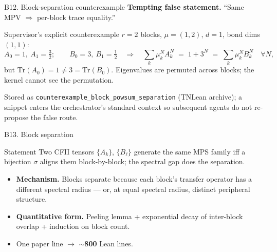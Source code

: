 \documentclass[aspectratio=169,10pt]{beamer}
\newcommand{\Tr}{\mathrm{Tr}}
\begin{document}
\begin{frame}{B12. Block-separation counterexample}
    \textbf{Tempting false statement.} ``Same MPV $\Rightarrow$ per-block trace equality.''
    \vspace{0.4em}
    \begin{block}{Supervisor's explicit counterexample}
        \footnotesize
        $r = 2$ blocks, $\mu = (1,2)$, $d=1$, bond dims $(1,1)$:
        \[
            A_0 = 1,\ A_1 = \tfrac{3}{2}; \qquad B_0 = 3,\ B_1 = \tfrac{1}{2}
            \quad\Longrightarrow\quad
            \sum_{k} \mu_k^N A_k^N \;=\; 1 + 3^N \;=\; \sum_{k} \mu_k^N B_k^N \quad \forall N,
        \]
        but $\Tr(A_0) = 1 \neq 3 = \Tr(B_0)$. Eigenvalues are permuted across blocks; the kernel cannot see the permutation.
    \end{block}
    \vspace{0.2em}
    \textcolor{dimwhite}{\footnotesize Stored as \texttt{counterexample\_block\_powsum\_separation} (TNLean archive); a snippet enters the orchestrator's standard context so subsequent agents do not re-propose the false route.}
\end{frame}

\begin{frame}{B13. Block separation}
    \begin{block}{Statement}
        Two CFII tensors $\{A_k\}$, $\{B_\ell\}$ generate the same MPS family iff a bijection $\sigma$ aligns them block-by-block; the spectral gap does the separation.
    \end{block}
    \vspace{0.5em}
    \begin{itemize}
        \item \textbf{Mechanism.} Blocks separate because each block's transfer operator has a different spectral radius --- or, at equal spectral radius, distinct peripheral structure.
        \item \textbf{Quantitative form.} Peeling lemma + exponential decay of inter-block overlap + induction on block count.
        \item One paper line $\to$ $\sim$\textbf{800} Lean lines.
    \end{itemize}
\end{frame}
\end{document}
